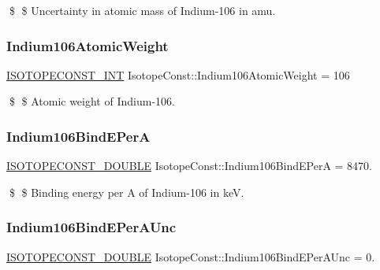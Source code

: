 \$ \$ Uncertainty in atomic mass of Indium-\/106 in amu. \mbox{\label{group___isotope_const-_indium-_in106_ga834c792a92e2e17c089a036ed8269161}} 
\subsubsection{\texorpdfstring{Indium106\+Atomic\+Weight}{Indium106AtomicWeight}}
{\footnotesize\ttfamily \mbox{\hyperlink{group___isotope_const-_macros_ga5f18360b3e99483a35c32d789e62621c}{I\+S\+O\+T\+O\+P\+E\+C\+O\+N\+S\+T\+\_\+\+I\+NT}} Isotope\+Const\+::\+Indium106\+Atomic\+Weight = 106}

\$ \$ Atomic weight of Indium-\/106. \mbox{\label{group___isotope_const-_indium-_in106_gaa3b8308a33693cefeedb85d9369de260}} 
\subsubsection{\texorpdfstring{Indium106\+Bind\+E\+PerA}{Indium106BindEPerA}}
{\footnotesize\ttfamily \mbox{\hyperlink{group___isotope_const-_macros_ga8f45a7272ce02c0b4c65c44636ed719a}{I\+S\+O\+T\+O\+P\+E\+C\+O\+N\+S\+T\+\_\+\+D\+O\+U\+B\+LE}} Isotope\+Const\+::\+Indium106\+Bind\+E\+PerA = 8470.}

\$ \$ Binding energy per A of Indium-\/106 in keV. \mbox{\label{group___isotope_const-_indium-_in106_gadadf2e3424864349597e551d8e00eb39}} 
\subsubsection{\texorpdfstring{Indium106\+Bind\+E\+Per\+A\+Unc}{Indium106BindEPerAUnc}}
{\footnotesize\ttfamily \mbox{\hyperlink{group___isotope_const-_macros_ga8f45a7272ce02c0b4c65c44636ed719a}{I\+S\+O\+T\+O\+P\+E\+C\+O\+N\+S\+T\+\_\+\+D\+O\+U\+B\+LE}} Isotope\+Const\+::\+Indium106\+Bind\+E\+Per\+A\+Unc = 0.}

